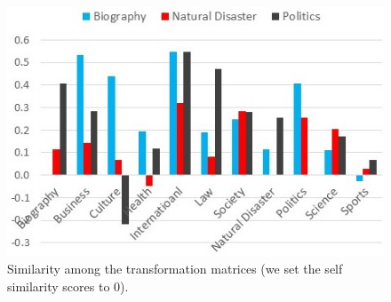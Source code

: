 \documentclass[letterpaper]{article}
\begin{document}
\begin{figure}
\centering
\includegraphics[width=0.9\linewidth]{CategoryMatrixSimilarity}
\caption{Similarity among the transformation matrices (we set the self similarity scores to 0).}
\label{fig:CategoryMatrixSimilarity}
\end{figure}
\end{document}
